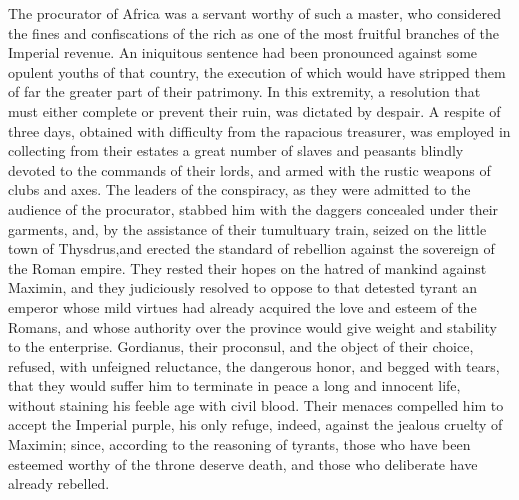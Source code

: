 The procurator of Africa was a servant worthy of such a master,
who considered the fines and confiscations of the rich as one of
the most fruitful branches of the Imperial revenue. An iniquitous
sentence had been pronounced against some opulent youths of that
country, the execution of which would have stripped them of far
the greater part of their patrimony. In this extremity, a
resolution that must either complete or prevent their ruin, was
dictated by despair. A respite of three days, obtained with
difficulty from the rapacious treasurer, was employed in
collecting from their estates a great number of slaves and
peasants blindly devoted to the commands of their lords, and
armed with the rustic weapons of clubs and axes. The leaders of
the conspiracy, as they were admitted to the audience of the
procurator, stabbed him with the daggers concealed under their
garments, and, by the assistance of their tumultuary train,
seized on the little town of Thysdrus,\footnotemark[13] and erected the
standard of rebellion against the sovereign of the Roman empire.
They rested their hopes on the hatred of mankind against Maximin,
and they judiciously resolved to oppose to that detested tyrant
an emperor whose mild virtues had already acquired the love and
esteem of the Romans, and whose authority over the province would
give weight and stability to the enterprise. Gordianus, their
proconsul, and the object of their choice, refused, with
unfeigned reluctance, the dangerous honor, and begged with tears,
that they would suffer him to terminate in peace a long and
innocent life, without staining his feeble age with civil blood.
Their menaces compelled him to accept the Imperial purple, his
only refuge, indeed, against the jealous cruelty of Maximin;
since, according to the reasoning of tyrants, those who have been
esteemed worthy of the throne deserve death, and those who
deliberate have already rebelled.\footnotemark[14]



